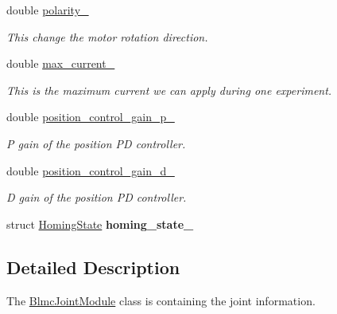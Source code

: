 \begin{DoxyCompactItemize}
double \hyperlink{classblmc__robots_1_1BlmcJointModule_a6ec97901099ebcc3466851624c656f08}{polarity\+\_\+}
\begin{DoxyCompactList}\small\item\em This change the motor rotation direction. \end{DoxyCompactList}\item 
double \hyperlink{classblmc__robots_1_1BlmcJointModule_af10e1b734a9d4735301962fd9f9c413f}{max\+\_\+current\+\_\+}
\begin{DoxyCompactList}\small\item\em This is the maximum current we can apply during one experiment. \end{DoxyCompactList}\item 
\mbox{\label{classblmc__robots_1_1BlmcJointModule_afa5a06b057850fc626649fd13e3f376c}} 
double \hyperlink{classblmc__robots_1_1BlmcJointModule_afa5a06b057850fc626649fd13e3f376c}{position\+\_\+control\+\_\+gain\+\_\+p\+\_\+}
\begin{DoxyCompactList}\small\item\em P gain of the position PD controller. \end{DoxyCompactList}\item 
\mbox{\label{classblmc__robots_1_1BlmcJointModule_a1141b35d0c53d1f4cca107919c1c861e}} 
double \hyperlink{classblmc__robots_1_1BlmcJointModule_a1141b35d0c53d1f4cca107919c1c861e}{position\+\_\+control\+\_\+gain\+\_\+d\+\_\+}
\begin{DoxyCompactList}\small\item\em D gain of the position PD controller. \end{DoxyCompactList}\item 
\mbox{\label{classblmc__robots_1_1BlmcJointModule_ab7a861d47a808b14e43af7f58ca56284}} 
struct \hyperlink{structblmc__robots_1_1HomingState}{Homing\+State} {\bfseries homing\+\_\+state\+\_\+}
\end{DoxyCompactItemize}


\subsection{Detailed Description}
The \hyperlink{classblmc__robots_1_1BlmcJointModule}{Blmc\+Joint\+Module} class is containing the joint information. 

